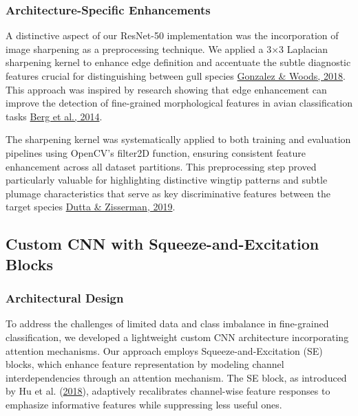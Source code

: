 \documentclass[a4paper,12pt]{article}
\begin{document}
\subsubsection{Architecture-Specific Enhancements}

A distinctive aspect of our ResNet-50 implementation was the incorporation of image sharpening as a preprocessing technique. We applied a 3×3 Laplacian sharpening kernel to enhance edge definition and accentuate the subtle diagnostic features crucial for distinguishing between gull species {\href{https://www.pearson.com/en-us/subject-catalog/p/digital-image-processing/P200000003546}{Gonzalez \& Woods, 2018}}. This approach was inspired by research showing that edge enhancement can improve the detection of fine-grained morphological features in avian classification tasks {\href{https://openaccess.thecvf.com/content_cvpr_2014/papers/Berg_Birdsnap_Large-scale_Fine-grained_2014_CVPR_paper.pdf}{Berg et al., 2014}}.

The sharpening kernel was systematically applied to both training and evaluation pipelines using OpenCV's filter2D function, ensuring consistent feature enhancement across all dataset partitions. This preprocessing step proved particularly valuable for highlighting distinctive wingtip patterns and subtle plumage characteristics that serve as key discriminative features between the target species {\href{https://ieeexplore.ieee.org/document/8659085}{Dutta \& Zisserman, 2019}}.

\subsection{Custom CNN with Squeeze-and-Excitation Blocks}

\subsubsection{Architectural Design}

To address the challenges of limited data and class imbalance in fine-grained classification, we developed a lightweight custom CNN architecture incorporating attention mechanisms. Our approach employs Squeeze-and-Excitation (SE) blocks, which enhance feature representation by modeling channel interdependencies through an attention mechanism. The SE block, as introduced by Hu et al. (\href{https://openaccess.thecvf.com/content_cvpr_2018/papers/Hu_Squeeze-and-Excitation_Networks_CVPR_2018_paper.pdf}{2018}), adaptively recalibrates channel-wise feature responses to emphasize informative features while suppressing less useful ones.
\end{document}
